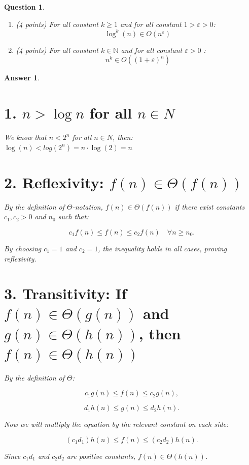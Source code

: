 \documentclass[a4paper]{article}
\theoremstyle{remarksStyle}
\theoremstyle{questionStyle}
\newtheorem{question}{Question}
\theoremstyle{answerStyle}
\newtheorem{answer}{Answer}
\begin{document}
\begin{question}
\begin{enumerate}
    \item (4 points) \label{q2:log} For all constant $k \ge 1$ and for all constant $1 > \varepsilon > 0$:
    \[ \log^k (n) \in O (n^\varepsilon) \]
    \item (4 points) \label{q2:exp} For all constant $k \in \mathbb{N}$ and for all constant $\varepsilon > 0$ :
    \[n^k \in O( (1 + \varepsilon)^n)\]
\end{enumerate}
\end{question}

\begin{answer}
\item 
\section*{1. \( n > \log n \) for all \( n \in N \) }

We know that $n < 2^n$ for all $n \in N$, then: $\log(n) < log(2^n) = n \cdot \log(2) = n$

\section*{2. Reflexivity: \( f(n) \in \Theta(f(n)) \) }

By the definition of \(\Theta\)-notation, \( f(n) \in \Theta(f(n)) \) if there exist constants \( c_1, c_2 > 0 \) and \( n_0 \) such that:

\[
c_1 f(n) \leq f(n) \leq c_2 f(n) \quad \forall n \geq n_0.
\]

By choosing \( c_1 = 1 \) and \( c_2 = 1 \), the inequality holds in all cases, proving reflexivity.

\section*{3. Transitivity: If \( f(n) \in \Theta(g(n)) \) and \( g(n) \in \Theta(h(n)) \), then \( f(n) \in \Theta(h(n)) \)}

By the definition of $\Theta$:

\[
c_1 g(n) \leq f(n) \leq c_2 g(n),
\]

\[
d_1 h(n) \leq g(n) \leq d_2 h(n).
\]

Now we will multiply the equation by the relevant constant on each side:

\[
(c_1 d_1) h(n) \leq f(n) \leq (c_2 d_2) h(n).
\]

Since \( c_1 d_1 \) and \( c_2 d_2 \) are positive constants, \( f(n) \in \Theta(h(n)) \).


\end{answer}
\end{document}
